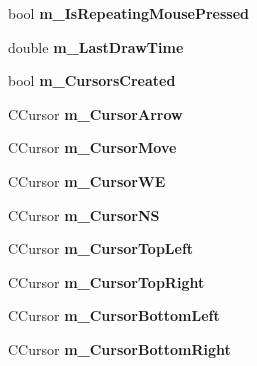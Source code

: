 \begin{DoxyCompactItemize}
\item 
\hypertarget{struct_c_tw_mgr_ac6795643c8445c934830c09596d02c9d}{bool {\bfseries m\+\_\+\+Is\+Repeating\+Mouse\+Pressed}}\label{struct_c_tw_mgr_ac6795643c8445c934830c09596d02c9d}

\item 
\hypertarget{struct_c_tw_mgr_a031498aa163f216b701bae06412a3306}{double {\bfseries m\+\_\+\+Last\+Draw\+Time}}\label{struct_c_tw_mgr_a031498aa163f216b701bae06412a3306}

\item 
\hypertarget{struct_c_tw_mgr_a72c789040b221159564101a94b3de81d}{bool {\bfseries m\+\_\+\+Cursors\+Created}}\label{struct_c_tw_mgr_a72c789040b221159564101a94b3de81d}

\item 
\hypertarget{struct_c_tw_mgr_ab21c67ba62b7860602497bb13ae8d831}{C\+Cursor {\bfseries m\+\_\+\+Cursor\+Arrow}}\label{struct_c_tw_mgr_ab21c67ba62b7860602497bb13ae8d831}

\item 
\hypertarget{struct_c_tw_mgr_a5556878466d8ded863dbba17a4a3b45e}{C\+Cursor {\bfseries m\+\_\+\+Cursor\+Move}}\label{struct_c_tw_mgr_a5556878466d8ded863dbba17a4a3b45e}

\item 
\hypertarget{struct_c_tw_mgr_a4dbcf0fd939d6dd6b6af09f0b16ee989}{C\+Cursor {\bfseries m\+\_\+\+Cursor\+W\+E}}\label{struct_c_tw_mgr_a4dbcf0fd939d6dd6b6af09f0b16ee989}

\item 
\hypertarget{struct_c_tw_mgr_a75b25b7e364ed5bc4dd6a672580eac8f}{C\+Cursor {\bfseries m\+\_\+\+Cursor\+N\+S}}\label{struct_c_tw_mgr_a75b25b7e364ed5bc4dd6a672580eac8f}

\item 
\hypertarget{struct_c_tw_mgr_a96f1a22567e31b4b4001d2ac9ae87a7f}{C\+Cursor {\bfseries m\+\_\+\+Cursor\+Top\+Left}}\label{struct_c_tw_mgr_a96f1a22567e31b4b4001d2ac9ae87a7f}

\item 
\hypertarget{struct_c_tw_mgr_a989c035d14ea31e4e9ea6f16a8c50a5d}{C\+Cursor {\bfseries m\+\_\+\+Cursor\+Top\+Right}}\label{struct_c_tw_mgr_a989c035d14ea31e4e9ea6f16a8c50a5d}

\item 
\hypertarget{struct_c_tw_mgr_afb52624d8be435f03a066a9493838db6}{C\+Cursor {\bfseries m\+\_\+\+Cursor\+Bottom\+Left}}\label{struct_c_tw_mgr_afb52624d8be435f03a066a9493838db6}

\item 
\hypertarget{struct_c_tw_mgr_a704f1950e94da2785a67869499c8efd4}{C\+Cursor {\bfseries m\+\_\+\+Cursor\+Bottom\+Right}}\label{struct_c_tw_mgr_a704f1950e94da2785a67869499c8efd4}


\end{DoxyCompactItemize}
